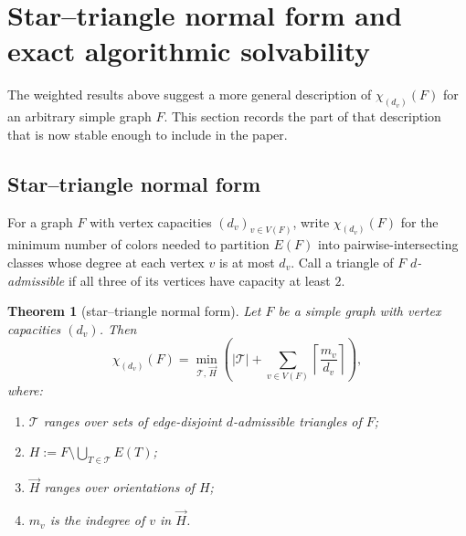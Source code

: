 \documentclass[11pt]{article}
\newtheorem{theorem}{Theorem}[section]
\theoremstyle{definition}
\newcommand{\Chi}{\chi}
\begin{document}
\section{Star--triangle normal form and exact algorithmic solvability}
The weighted results above suggest a more general description of \(\Chi_{(d_v)}(F)\) for an arbitrary simple graph \(F\). This section records the part of that description that is now stable enough to include in the paper.

\subsection{Star--triangle normal form}
For a graph \(F\) with vertex capacities \((d_v)_{v\in V(F)}\), write \(\Chi_{(d_v)}(F)\) for the minimum number of colors needed to partition \(E(F)\) into pairwise-intersecting classes whose degree at each vertex \(v\) is at most \(d_v\). Call a triangle of \(F\) \emph{\(d\)-admissible} if all three of its vertices have capacity at least \(2\).

\begin{theorem}[star--triangle normal form]\label{thm:star-triangle}
Let \(F\) be a simple graph with vertex capacities \((d_v)\). Then
\[
\Chi_{(d_v)}(F)
=
\min_{\mathcal T,\,\vec H}
\left(
|\mathcal T|+\sum_{v\in V(F)} \left\lceil \frac{m_v}{d_v}\right\rceil
\right),
\]
where:
\begin{enumerate}[label=(\roman*)]
    \item \(\mathcal T\) ranges over sets of edge-disjoint \(d\)-admissible triangles of \(F\);
    \item \(H:=F\setminus \bigcup_{T\in\mathcal T} E(T)\);
    \item \(\vec H\) ranges over orientations of \(H\);
    \item \(m_v\) is the indegree of \(v\) in \(\vec H\).
\end{enumerate}
\end{theorem}
\end{document}
